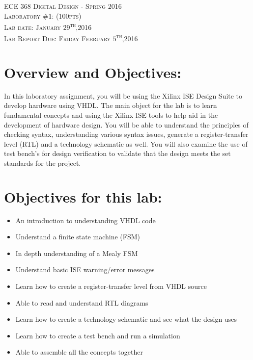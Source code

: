 \documentclass{article}
\begin{document}
\begin{center}
\textsc{\huge ECE 368 Digital Design - Spring 2016}\\[1cm]
\textsc{{\LARGE Laboratory \#1: (100pts)}}\\[0.5cm]
\textsc{\Large Lab date: January $29$\textsuperscript{th},2016}\\[0.5cm]
\textsc{\Large Lab Report Due: Friday February $5$\textsuperscript{th},2016}\\[1cm]
\end{center}

\section{Overview and Objectives:}
In this laboratory assignment, you will be using the Xilinx ISE Design Suite to develop hardware using VHDL. The main object for the lab is to learn fundamental concepts and using the Xilinx ISE tools to help aid in the development of hardware design. You will be able to understand the principles of checking syntax, understanding various syntax issues, generate a register-transfer level (RTL) and a technology schematic as well. You will also examine the use of test bench's for design verification to validate that the design meets the set standards for the project.

\section{Objectives for this lab:}
\begin{itemize}
  \item An introduction to understanding VHDL code
  \item Understand a finite state machine (FSM)
  \item In depth understanding of a Mealy FSM
  \item Understand basic ISE warning/error messages
  \item Learn how to create a register-transfer level from VHDL source
  \item Able to read and understand RTL diagrams
  \item Learn how to create a technology schematic and see what the design uses
  \item Learn how to create a test bench and run a simulation
  \item Able to assemble all the concepts together
\end{itemize}
\end{document}
